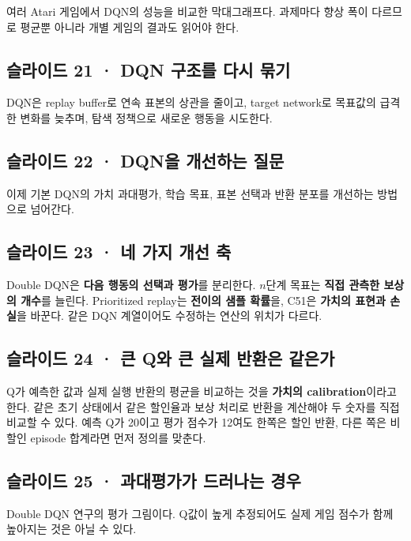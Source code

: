 \documentclass[11pt,a4paper]{article}
\begin{document}
여러 Atari 게임에서 DQN의 성능을 비교한 막대그래프다. 과제마다 향상 폭이 다르므로 평균뿐 아니라 개별 게임의 결과도 읽어야 한다.\par

\subsection{슬라이드 21 · DQN 구조를 다시 묶기}

DQN은 replay buffer로 연속 표본의 상관을 줄이고, target network로 목표값의 급격한 변화를 늦추며, 탐색 정책으로 새로운 행동을 시도한다.\par

\subsection{슬라이드 22 · DQN을 개선하는 질문}

이제 기본 DQN의 가치 과대평가, 학습 목표, 표본 선택과 반환 분포를 개선하는 방법으로 넘어간다.\par

\subsection{슬라이드 23 · 네 가지 개선 축}

Double DQN은 \textbf{다음 행동의 선택과 평가}를 분리한다. $n$단계 목표는 \textbf{직접 관측한 보상의 개수}를 늘린다. Prioritized replay는 \textbf{전이의 샘플 확률}을, C51은 \textbf{가치의 표현과 손실}을 바꾼다. 같은 DQN 계열이어도 수정하는 연산의 위치가 다르다.\par

\subsection{슬라이드 24 · 큰 Q와 큰 실제 반환은 같은가}

Q가 예측한 값과 실제 실행 반환의 평균을 비교하는 것을 \textbf{가치의 calibration}이라고 한다. 같은 초기 상태에서 같은 할인율과 보상 처리로 반환을 계산해야 두 숫자를 직접 비교할 수 있다. 예측 Q가 20이고 평가 점수가 12여도 한쪽은 할인 반환, 다른 쪽은 비할인 episode 합계라면 먼저 정의를 맞춘다.\par

\subsection{슬라이드 25 · 과대평가가 드러나는 경우}

Double DQN 연구의 평가 그림이다. Q값이 높게 추정되어도 실제 게임 점수가 함께 높아지는 것은 아닐 수 있다.\par
\end{document}
